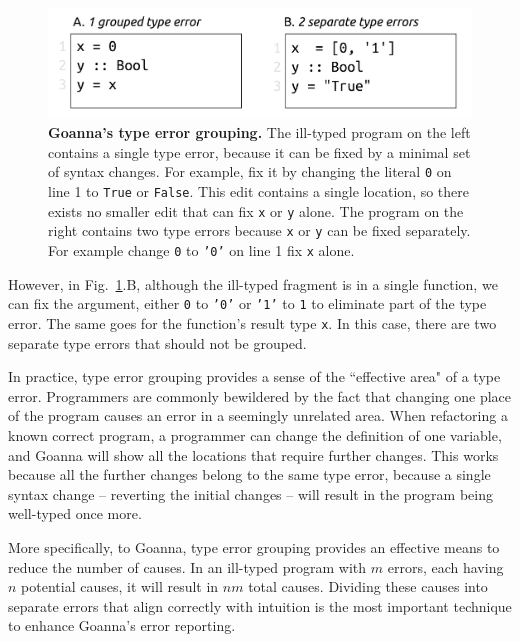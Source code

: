 \documentclass[pdflatex,lineno,sn-nature,Numbered]{sn-jnl}%
\begin{document}
   \begin{figure}[ht!]
        \centering
        \includegraphics[width=0.8\linewidth]{images/Grouping-Example}
        \caption[Goanna's type error grouping]{\textbf{Goanna's type error grouping.} The ill-typed program on the left contains a single type error, because it can be fixed by a minimal set of syntax changes. For example, fix it by changing the literal \texttt{0} on line 1 to \texttt{True} or \texttt{False}. This edit contains a single location, so there exists no smaller edit that can fix \texttt{x} or \texttt{y} alone. The program on the right contains two type errors because \texttt{x} or \texttt{y} can be fixed separately. For example change \texttt{0} to \texttt{'0'} on line 1 fix \texttt{x} alone. }
        \label{fig:grouping-example}
    \end{figure}


    However, in Fig.~\ref{fig:grouping-example}.B, although the ill-typed fragment is in a single function, we can fix the argument, either \texttt{0} to \texttt{'0'} or \texttt{'1'} to \texttt{1} to eliminate part of the type error. The same goes for the function's result type \texttt{x}. In this case, there are two separate type errors that should not be grouped.

	In practice, type error grouping provides a sense of the ``effective area" of a type error. Programmers are commonly bewildered by the fact that changing one place of the program causes an error in a seemingly unrelated area. When refactoring a known correct program, a programmer can change the definition of one variable, and Goanna will show all the locations that require further changes. This works because all the further changes belong to the same type error, because a single syntax change -- reverting the initial changes -- will result in the program being well-typed once more.
	
	More specifically, to Goanna, type error grouping provides an effective means to reduce the number of causes. In an ill-typed program with $m$ errors, each having $n$ potential causes, it will result in $nm$ total causes. Dividing these causes into separate errors that align correctly with intuition is the most important technique to enhance Goanna's error reporting.
\end{document}
